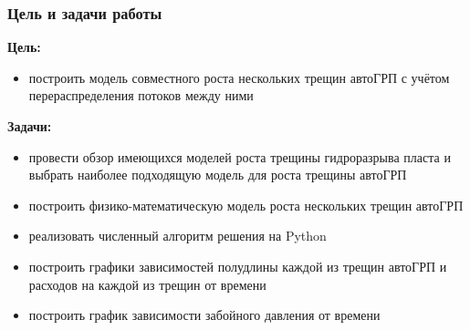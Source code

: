 \documentclass{beamer}
\begin{document}
\begin{frame}
\frametitle{Цель и задачи работы}

\textbf{Цель:}
\begin{itemize}
	\item построить модель совместного роста нескольких трещин автоГРП с учётом перераспределения потоков между ними
\end{itemize}

\textbf{Задачи:}
\begin{itemize}
	\item провести обзор имеющихся моделей роста трещины гидроразрыва пласта и выбрать наиболее подходящую модель для роста трещины автоГРП
	\item построить физико-математическую модель роста нескольких трещин автоГРП
	\item реализовать численный алгоритм решения на Python
	\item построить графики зависимостей полудлины каждой из трещин автоГРП и расходов на каждой из трещин от времени
	\item построить график зависимости забойного давления от времени
\end{itemize}

\end{frame}
\end{document}
